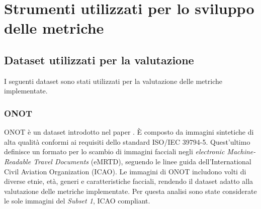 \documentclass[12pt,a4paper,openright,twoside]{book}
\begin{document}
\chapter{Strumenti utilizzati per lo sviluppo delle metriche}

\section{Dataset utilizzati per la valutazione}
I seguenti dataset sono stati utilizzati per la valutazione delle metriche implementate.

\subsection{ONOT}
ONOT è un dataset introdotto nel paper \cite[ONOT: a High-Quality ICAO-compliant Synthetic Mugshot Dataset]{di2024onot}.
È composto da immagini sintetiche di alta qualità conformi ai requisiti dello standard ISO/IEC 39794-5.
Quest'ultimo definisce un formato per lo scambio di immagini facciali negli \textit{electronic Machine-Readable Travel Documents} (eMRTD), seguendo le linee guida dell'International Civil Aviation Organization (ICAO).
Le immagini di ONOT includono volti di diverse etnie, età, generi e caratteristiche facciali, rendendo il dataset adatto alla valutazione delle metriche implementate.
Per questa analisi sono state considerate le sole immagini del \textit{Subset 1}, ICAO compliant.
\end{document}
